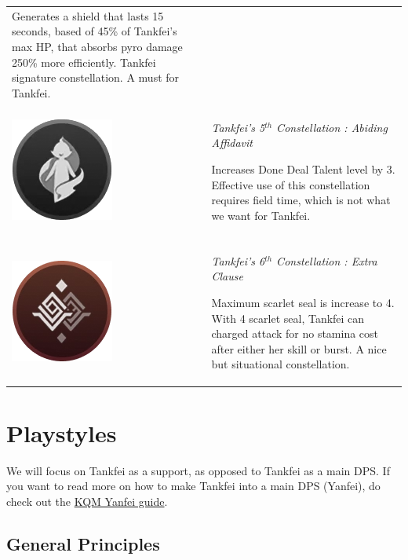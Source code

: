 \documentclass[11pt]{article}
\begin{document}
\begin{tabular}{m{} m{} }
Generates a shield that lasts 15 seconds, based of 45\% of Tankfei's max HP, that absorbs pyro damage 250\% more efficiently. Tankfei signature constellation. A must for Tankfei. \\
\\
\includegraphics[scale = 0.27]{Constellation5_Greyscale.png} & \textit{Tankfei's 5$^{th}$ Constellation : Abiding Affidavit} 
    
Increases Done Deal Talent level by 3. Effective use of this constellation requires field time, which is not what we want for Tankfei.\\
\\
\includegraphics[scale = 0.27]{Constellation6.png} & \textit{Tankfei's 6$^{th}$ Constellation : Extra Clause} 
    
Maximum scarlet seal is increase to 4. With 4 scarlet seal, Tankfei can charged attack for no stamina cost after either her skill or burst. A nice but situational constellation.  \\
    
\end{tabular}

\newpage

\section{Playstyles}

We will focus on Tankfei as a support, as opposed to Tankfei as a main DPS. If you want to read more on how to make Tankfei into a main DPS (Yanfei), do check out the \href{https://keqingmains.com/yanfei/}{KQM Yanfei guide}.  

\subsection{General Principles}
\end{document}
